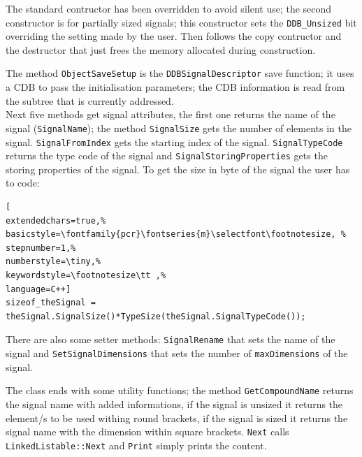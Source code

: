The standard contructor has been overridden to avoid silent use; the second constructor is for partially sized signals; this constructor sets the \texttt{DDB\_Unsized} bit overriding the setting made by the user. Then follows the copy contructor and the destructor that just frees the memory allocated during construction.

The method \texttt{ObjectSaveSetup} is the \texttt{DDBSignalDescriptor} save function; it uses a CDB to pass the initialisation parameters; the CDB information is read from the subtree that is currently addressed. \\


Next five methods get signal attributes, the first one returns the name of the signal (\texttt{SignalName}); the method \texttt{SignalSize} gets the number of elements in the signal. \texttt{SignalFromIndex} gets the starting index of the signal. \texttt{SignalTypeCode} returns the type code of the signal and \texttt{SignalStoringProperties} gets the storing properties of the signal. To get the size in byte of the signal the user has to code:
\begin{lstlisting}[
extendedchars=true,%
basicstyle=\fontfamily{pcr}\fontseries{m}\selectfont\footnotesize, %
stepnumber=1,%
numberstyle=\tiny,%
keywordstyle=\footnotesize\tt ,%
language=C++]
sizeof_theSignal = theSignal.SignalSize()*TypeSize(theSignal.SignalTypeCode());
\end{lstlisting}

There are also some setter methods: \texttt{SignalRename} that sets the name of the signal and \texttt{SetSignalDimensions} that sets the number of \texttt{maxDimensions} of the signal.

The class ends with some utility functions; the method \texttt{GetCompoundName} returns the signal name with added informations, if the signal is unsized it returns the element/s to be used withing round brackets, if the signal is sized it returns the signal name with the dimension within square brackets. \texttt{Next} calls \texttt{LinkedListable::Next} and \texttt{Print} simply prints the content.


